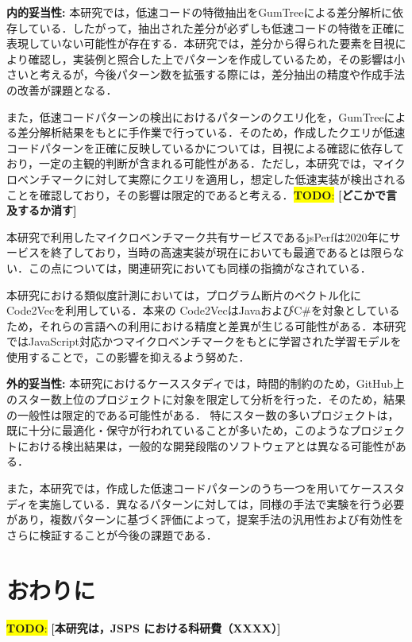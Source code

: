\documentclass[submit,techrep,noauthor]{ipsj}
\newcommand{\todo}[1]{\colorbox{yellow}{{\bf TODO}:}{\color{red} {\textbf{[#1]}}}}
\begin{document}
\noindent\textbf{内的妥当性: }
本研究では，低速コードの特徴抽出をGumTreeによる差分解析に依存している．したがって，抽出された差分が必ずしも低速コードの特徴を正確に表現していない可能性が存在する．本研究では，差分から得られた要素を目視により確認し，実装例と照合した上でパターンを作成しているため，その影響は小さいと考えるが，今後パターン数を拡張する際には，差分抽出の精度や作成手法の改善が課題となる．

また，低速コードパターンの検出におけるパターンのクエリ化を，GumTreeによる差分解析結果をもとに手作業で行っている．そのため，作成したクエリが低速コードパターンを正確に反映しているかについては，目視による確認に依存しており，一定の主観的判断が含まれる可能性がある．ただし，本研究では，マイクロベンチマークに対して実際にクエリを適用し，想定した低速実装が検出されることを確認しており，その影響は限定的であると考える．\todo{どこかで言及するか消す}

本研究で利用したマイクロベンチマーク共有サービスであるjsPerfは2020年にサービスを終了しており，当時の高速実装が現在においても最適であるとは限らない．この点については，関連研究\cite{omori}においても同様の指摘がなされている．

本研究における類似度計測においては，プログラム断片のベクトル化にCode2Vecを利用している．本来の Code2VecはJavaおよびC\#を対象としているため，それらの言語への利用における精度と差異が生じる可能性がある．本研究ではJavaScript対応かつマイクロベンチマークをもとに学習された学習モデル\cite{saiki}を使用することで，この影響を抑えるよう努めた．

\noindent\textbf{外的妥当性: }
本研究におけるケーススタディでは，時間的制約のため，GitHub上のスター数上位のプロジェクトに対象を限定して分析を行った．そのため，結果の一般性は限定的である可能性がある．
特にスター数の多いプロジェクトは，既に十分に最適化・保守が行われていることが多いため，このようなプロジェクトにおける検出結果は，一般的な開発段階のソフトウェアとは異なる可能性がある．

また，本研究では，作成した低速コードパターンのうち一つを用いてケーススタディを実施している．異なるパターンに対しては，同様の手法で実験を行う必要があり，複数パターンに基づく評価によって，提案手法の汎用性および有効性をさらに検証することが今後の課題である．


\section{おわりに}
\label{sec:summary}

\begin{acknowledgment}
\todo{本研究は，JSPS における科研費（XXXX）}
\end{acknowledgment}





\end{document}
